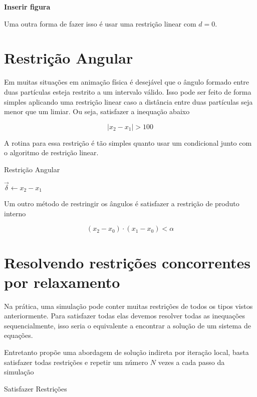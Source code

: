 \textbf{Inserir figura}

Uma outra forma de fazer isso é usar uma restrição linear com $d=0$.

\section{Restrição Angular}

Em muitas situações em animação física é desejável que o ângulo formado entre duas partículas esteja restrito a um intervalo válido. Isso pode ser feito de forma simples aplicando uma restrição linear caso a distância entre duas partículas seja menor que um limiar. Ou seja, satisfazer a inequação abaixo

$$|x_2 - x_1| > 100$$

A rotina para essa restrição é tão simples quanto usar um condicional junto com o algoritmo de restrição linear.

\begin{algorithm}
	\caption{Restrição Angular}
	$\vec{\delta} \leftarrow x_2 - x_1$ \\
\end{algorithm}

Um outro método de restringir os ângulos é satisfazer a restrição de produto interno

$$(x_2-x_0) \cdot (x_1 - x_0) < \alpha$$


\section{Resolvendo restrições concorrentes por relaxamento}

Na prática, uma simulação pode conter muitas restrições de todos os tipos vistos anteriormente. Para satisfazer todas elas devemos resolver todas as inequações sequencialmente, isso seria o equivalente a encontrar a solução de um sistema de equações.

Entretanto  propõe uma abordagem de solução indireta por iteração local, basta satisfazer todas restrições e repetir um número $N$ vezes a cada passo da simulação

\begin{algorithm}
	\caption{Satisfazer Restrições}
	\label{al:satisfazer_restricoes}
\end{algorithm}

